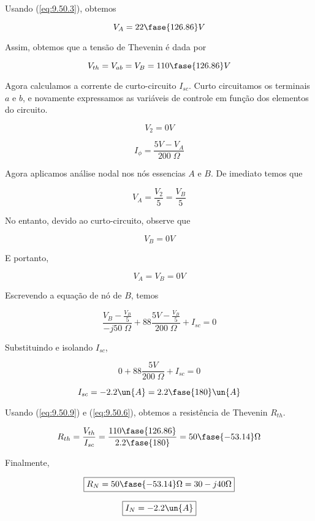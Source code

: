 Usando (\ref{eq:9.50.3}), obtemos

\begin{equation}\label{eq:9.50.5}
    V_{A} = 22\fase{126.86} V
\end{equation}

Assim, obtemos que a tensão de Thevenin é dada por

\begin{equation}\label{eq:9.50.6}
    V_{th} = V_{ab} = V_B = 110\fase{126.86} V
\end{equation}

Agora calculamos a corrente de curto-circuito \( I_{sc}\). 
Curto circuitamos os terminais \( a \) e \( b \), e novamente expressamos as variáveis de controle em função dos elementos
do circuito.

\begin{equation}\label{eq:9.50.7}
    V_{2} = 0 V
\end{equation}

\begin{equation}\label{eq:9.50.8}
    I_{\phi} = \frac{5V - V_A}{200 \;\Omega}
\end{equation}

Agora aplicamos análise nodal nos nós essencias \(A\) e \( B \).
De imediato temos que

\[ V_{A} = \frac{V_2}{5} = \frac{V_B}{5} \]

No entanto, devido ao curto-circuito, observe que 

\[ V_B = 0V \]

E portanto,

\[ V_A = V_B = 0V \]

Escrevendo a equação de nó de \(B\), temos

\[ \frac{V_B - \frac{V_B}{5}}{-j50 \;\Omega} + 88\frac{5V - \frac{V_B}{5}}{200 \;\Omega} + I_{sc} = 0 \]

Substituindo e isolando  \(I_{sc}\),

\[ 0 + 88\frac{5V}{200 \;\Omega} + I_{sc} = 0 \]

\begin{equation}\label{eq:9.50.9}
    I_{sc} = - 2.2 \un{A} = 2.2\fase{180} \un{A}
\end{equation}

Usando (\ref{eq:9.50.9}) e (\ref{eq:9.50.6}), obtemos a resistência de Thevenin \( R_{th} \).

\begin{equation}\label{eq:9.50.10}
    R_{th} = \frac{V_{th}}{I_{sc}} = \frac{110\fase{126.86}}{2.2\fase{180}} = 50\fase{-53.14} \Omega
\end{equation}

Finalmente,

\[ \boxed{R_{N} = 50\fase{-53.14} \Omega = 30 - j40 \Omega}  \]

\[ \boxed{I_{N} = - 2.2 \un{A}}  \]








